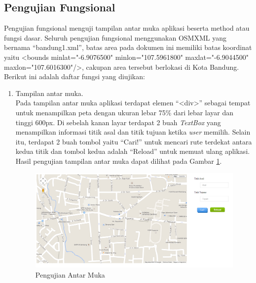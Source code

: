 \subsection{Pengujian Fungsional}
Pengujian fungsional menguji tampilan antar muka aplikasi beserta method atau
fungsi dasar. Seluruh pengujian fungsional menggunakan OSMXML
yang bernama ``bandung1.xml'', batas area pada dokumen ini memiliki batas
koordinat yaitu <bounds minlat="-6.9076500" minlon="107.5961800" maxlat="-6.9044500" 
maxlon="107.6016300"/>, cakupan area tersebut berlokasi di Kota Bandung.
Berikut ini adalah daftar fungsi yang diujikan:
\begin{enumerate}
  \item Tampilan antar muka.\\
  Pada tampilan antar muka aplikasi terdapat elemen ``<div>'' sebagai tempat
  untuk menampilkan peta dengan ukuran lebar 75\% dari lebar layar dan tinggi 600px. 
  Di sebelah kanan layar terdapat 2 buah \textit{TextBox} yang menampilkan informasi titik asal
  dan titik tujuan ketika \textit{user} memilih. Selain itu, terdapat 2 buah
  tombol yaitu ``Cari!'' untuk mencari rute terdekat antara kedua titik
  dan tombol kedua adalah ``Reload'' untuk memuat ulang aplikasi. Hasil
  pengujian tampilan antar muka dapat dilihat pada Gambar \ref{fig:pu_antarmuka}.
\begin{figure}[h]
\centering
\includegraphics[scale=0.45]{Gambar/pu_antarmuka}
\caption[Pengujian Antar Muka]{Pengujian Antar Muka}
\label{fig:pu_antarmuka}
\end{figure}
  

\end{enumerate}
